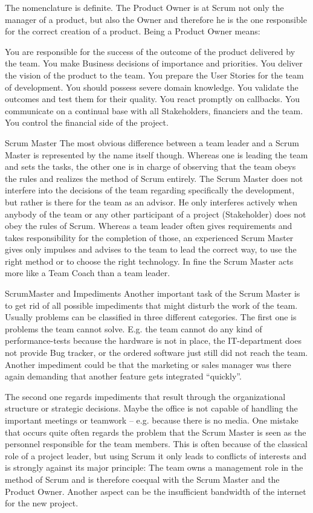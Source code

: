 The nomenclature is definite. The Product Owner is at Scrum not only the manager of a product, but also the Owner and therefore he is the one responsible for the correct creation of a product. Being a Product Owner means:

You are responsible for the success of the outcome of the product delivered by the team. You make Business decisions of importance and priorities. You deliver the vision of the product to the team. You prepare the User Stories for the team of development. You should possess severe domain knowledge. You validate the outcomes and test them for their quality. You react promptly on callbacks. You communicate on a continual base with all Stakeholders, financiers and the team. You control the financial side of the project.

Scrum Master
The most obvious difference between a team leader and a Scrum Master is represented by the name itself though. Whereas one is leading the team and sets the tasks, the other one is in charge of observing that the team obeys the rules and realizes the method of Scrum entirely. The Scrum Master does not interfere into the decisions of the team regarding specifically the development, but rather is there for the team as an advisor. He only interferes actively when anybody of the team or any other participant of a project (Stakeholder) does not obey the rules of Scrum. Whereas a team leader often gives requirements and takes responsibility for the completion of those, an experienced Scrum Master gives only impulses and advises to the team to lead the correct way, to use the right method or to choose the right technology. In fine the Scrum Master acts more like a Team Coach than a team leader.

ScrumMaster and Impediments
Another important task of the Scrum Master is to get rid of all possible impediments that might disturb the work of the team. Usually problems can be classified in three different categories. The first one is problems the team cannot solve. E.g. the team cannot do any kind of performance-tests because the hardware is not in place, the IT-department does not provide Bug tracker, or the ordered software just still did not reach the team. Another impediment could be that the marketing or sales manager was there again demanding that another feature gets integrated “quickly”.

The second one regards impediments that result through the organizational structure or strategic decisions. Maybe the office is not capable of handling the important meetings or teamwork – e.g. because there is no media. One mistake that occurs quite often regards the problem that the Scrum Master is seen as the personnel responsible for the team members. This is often because of the classical role of a project leader, but using Scrum it only leads to conflicts of interests and is strongly against its major principle: The team owns a management role in the method of Scrum and is therefore coequal with the Scrum Master and the Product Owner. Another aspect can be the insufficient bandwidth of the internet for the new project.

